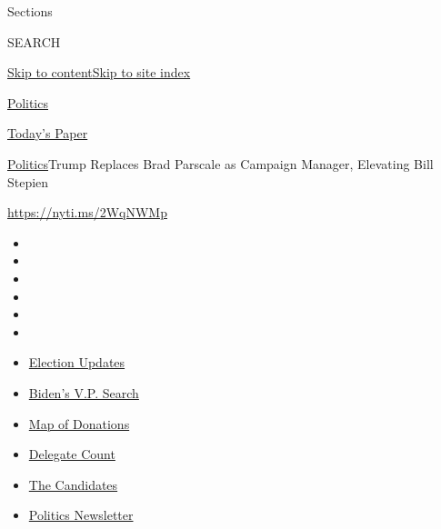Sections

SEARCH

\protect\hyperlink{site-content}{Skip to
content}\protect\hyperlink{site-index}{Skip to site index}

\href{https://www.nytimes3xbfgragh.onion/section/politics}{Politics}

\href{https://myaccount.nytimes3xbfgragh.onion/auth/login?response_type=cookie\&client_id=vi}{}

\href{https://www.nytimes3xbfgragh.onion/section/todayspaper}{Today's
Paper}

\href{/section/politics}{Politics}\textbar{}Trump Replaces Brad Parscale
as Campaign Manager, Elevating Bill Stepien

\url{https://nyti.ms/2WqNWMp}

\begin{itemize}
\item
\item
\item
\item
\item
\item
\end{itemize}

\begin{itemize}
\item
  \href{https://www.nytimes3xbfgragh.onion/2020/08/03/us/elections/biden-vs-trump.html?action=click\&pgtype=Article\&state=default\&region=TOP_BANNER\&context=storylines_menu}{Election
  Updates}
\item
  \href{https://www.nytimes3xbfgragh.onion/article/biden-vice-president-2020.html?action=click\&pgtype=Article\&state=default\&region=TOP_BANNER\&context=storylines_menu}{Biden's
  V.P. Search}
\item
  \href{https://www.nytimes3xbfgragh.onion/interactive/2020/07/24/us/politics/trump-biden-campaign-donors.html?action=click\&pgtype=Article\&state=default\&region=TOP_BANNER\&context=storylines_menu}{Map
  of Donations}
\item
  \href{https://www.nytimes3xbfgragh.onion/interactive/2020/us/elections/delegate-count-primary-results.html?action=click\&pgtype=Article\&state=default\&region=TOP_BANNER\&context=storylines_menu}{Delegate
  Count}
\item
  \href{https://www.nytimes3xbfgragh.onion/interactive/2019/us/politics/2020-presidential-candidates.html?action=click\&pgtype=Article\&state=default\&region=TOP_BANNER\&context=storylines_menu}{The
  Candidates}
\item
  \href{https://www.nytimes3xbfgragh.onion/newsletters/politics?action=click\&pgtype=Article\&state=default\&region=TOP_BANNER\&context=storylines_menu}{Politics
  Newsletter}
\end{itemize}

